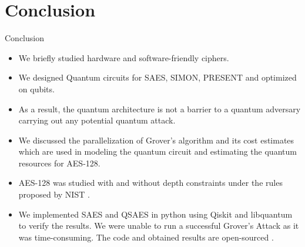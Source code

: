\section{Conclusion}

\begin{frame}{Conclusion}
    \begin{itemize}
        \item We briefly studied hardware and software-friendly ciphers.\pause
        \item We designed Quantum circuits for SAES, SIMON, PRESENT and optimized on qubits.\pause
        \item  As a result, the quantum architecture is not a barrier to a quantum adversary carrying out any potential quantum attack.\pause
        \item We discussed the parallelization of Grover's algorithm and its cost estimates which are used in modeling the quantum circuit and estimating the quantum resources for AES-128.\pause
        \item AES-128 was studied with and without depth constraints under the rules proposed by NIST \cite{nist}.\pause
        \item We implemented SAES and QSAES in python using Qiskit\cite{Qiskit}  and libquantum\cite{libquantum}  to verify the results. We were unable to run a successful Grover's Attack as it was time-consuming. The code and obtained results are open-sourced \cite{Gopal} .
    \end{itemize}
\end{frame}